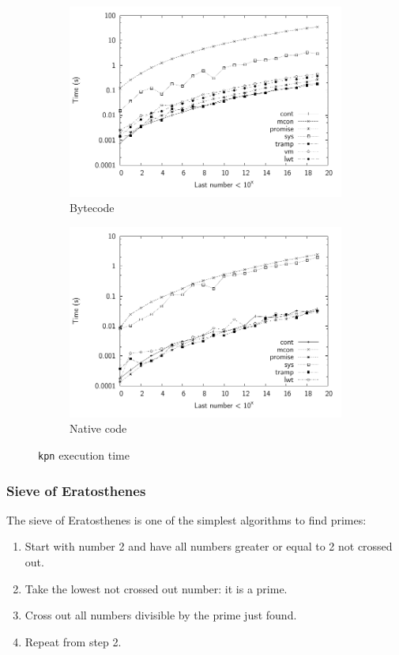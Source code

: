 \documentclass[12pt,twoside,notitlepage]{report}
\begin{document}
\begin{figure}
\centering
\begin{subfigure}[b]{0.45\linewidth}
\includegraphics[width=\linewidth]{./kpn_exec_times_bw}
\caption{Bytecode}
\label{fig:kpn_exec_times_bc}
\end{subfigure}
\begin{subfigure}[b]{0.45\linewidth}
\includegraphics[width=\linewidth]{./kpn_exec_times_opt_bw}
\caption{Native code}
\label{fig:kpn_exec_times_nat}
\end{subfigure}
\cprotect\caption{\verb|kpn| execution time}
\label{fig:kpn_exec_times}
\end{figure}



\subsubsection{Sieve of Eratosthenes}
The sieve of Eratosthenes is one of the simplest algorithms to find primes:
\begin{enumerate}
\item{Start with number 2 and have all numbers greater or equal to 2 not crossed out.}
\item{Take the lowest not crossed out number: it is a prime.}
\item{Cross out all numbers divisible by the prime just found.}
\item{Repeat from step 2.}
\end{enumerate}
\end{document}
